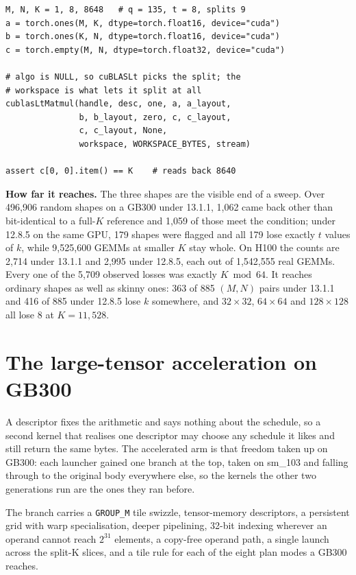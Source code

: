 \documentclass[sigplan,nonacm]{acmart}
\begin{document}
\begin{lstlisting}[style=python]
M, N, K = 1, 8, 8648   # q = 135, t = 8, splits 9
a = torch.ones(M, K, dtype=torch.float16, device="cuda")
b = torch.ones(K, N, dtype=torch.float16, device="cuda")
c = torch.empty(M, N, dtype=torch.float32, device="cuda")

# algo is NULL, so cuBLASLt picks the split; the
# workspace is what lets it split at all
cublasLtMatmul(handle, desc, one, a, a_layout,
               b, b_layout, zero, c, c_layout,
               c, c_layout, None,
               workspace, WORKSPACE_BYTES, stream)

assert c[0, 0].item() == K    # reads back 8640
\end{lstlisting}

\textbf{How far it reaches.} The three shapes are the visible end of a sweep.
Over 496,906 random shapes on a GB300 under 13.1.1, 1,062 came back other than
bit-identical to a full-$K$ reference and 1,059 of those meet the condition;
under 12.8.5 on the same GPU, 179 shapes were flagged and all 179 lose exactly
$t$ values of $k$, while 9,525,600 GEMMs at smaller $K$ stay whole. On H100 the
counts are 2,714 under 13.1.1 and 2,995 under 12.8.5, each out of 1,542,555 real
GEMMs. Every one of the 5,709 observed losses was exactly $K \bmod 64$. It
reaches ordinary shapes as well as skinny ones: 363 of 885 $(M, N)$ pairs under
13.1.1 and 416 of 885 under 12.8.5 lose $k$ somewhere, and $32 \times 32$,
$64 \times 64$ and $128 \times 128$ all lose 8 at $K = 11{,}528$.

\section{The large-tensor acceleration on GB300}
\label{app:accel}

A descriptor fixes the arithmetic and says nothing about the schedule, so a
second kernel that realises one descriptor may choose any schedule it likes and
still return the same bytes. The accelerated arm is that freedom taken up on
GB300: each launcher gained one branch at the top, taken on sm\_103 and falling
through to the original body everywhere else, so the kernels the other two
generations run are the ones they ran before.

The branch carries a \texttt{GROUP\_M} tile swizzle, tensor-memory
descriptors, a persistent grid with warp specialisation, deeper pipelining,
32-bit indexing wherever an operand cannot reach $2^{31}$ elements, a
copy-free operand path, a single launch across the split-K slices, and a tile
rule for each of the eight plan modes a GB300 reaches.
\end{document}
